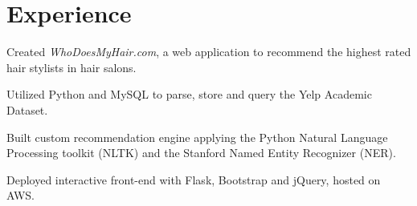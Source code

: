 \documentclass[letterpaper]{deedy-resume} %
\begin{document}
\hfill
%
%
\begin{minipage}[t]{0.66\textwidth} %


\section{Experience}


\vspace{\topsep} %
\begin{tightitemize}
\item Created \textit{WhoDoesMyHair.com}, a web application to recommend the highest rated hair stylists in hair salons.
\item Utilized Python and MySQL to parse, store and query the Yelp Academic Dataset.
\item Built custom recommendation engine applying the Python Natural Language Processing toolkit (NLTK) and the Stanford Named Entity Recognizer (NER).
\item Deployed interactive front-end with Flask, Bootstrap and jQuery, hosted on AWS.
\end{tightitemize}

\sectionspace %




\end{minipage}
\end{document}
